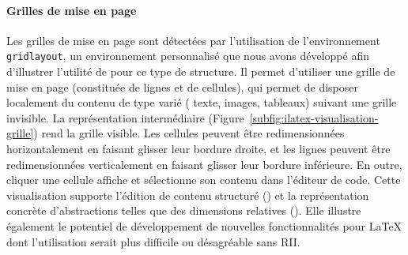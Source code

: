 \paragraph{Grilles de mise en page}
Les grilles de mise en page sont détectées par l'utilisation de l'environnement \texttt{gridlayout}, un environnement personnalisé que nous avons développé afin d'illustrer l'utilité de \iLaTeX{} pour ce type de structure.
Il permet d'utiliser une grille de mise en page (constituée de lignes et de cellules), qui permet de disposer localement du contenu de type varié (\eg{} texte, images, tableaux) suivant une grille invisible.
La représentation intermédiaire ({Figure~\ref{subfig:ilatex-visualisation-grille}}) rend la grille visible.
Les cellules peuvent être redimensionnées horizontalement en faisant glisser leur bordure droite, et les lignes peuvent être redimensionnées verticalement en faisant glisser leur bordure inférieure.
En outre, cliquer une cellule affiche et sélectionne son contenu dans l'éditeur de code.
Cette visualisation supporte l'édition de contenu structuré () et la représentation concrète d'abstractions telles que des dimensions relatives ().
Elle illustre également le potentiel de développement de nouvelles fonctionnalités pour \LaTeX{} dont l'utilisation serait plus difficile ou désagréable sans RII.


